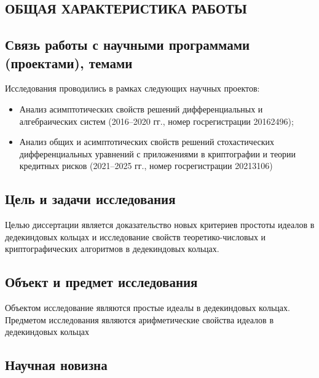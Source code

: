 \documentclass[_00_dissertation.tex]{subfiles}
\begin{document}
\onlyinsubfile{
    \renewcommand{\contentsname}{ОГЛАВЛЕНИЕ}
    \setcounter{tocdepth}{3}
    \tableofcontents
}

\begin{center}
    \chapter*{ОБЩАЯ ХАРАКТЕРИСТИКА РАБОТЫ}
\end{center}

\section*{Связь работы с научными программами (проектами), темами}

Исследования проводились в рамках следующих научных проектов:
\begin{itemize}
    \item Анализ асимптотических свойств решений дифференциальных и алгебраических систем (2016--2020 гг., номер госрегистрации 20162496);

    \item Анализ общих и асимптотических свойств решений стохастических дифференциальных уравнений с приложениями в криптографии и теории кредитных рисков (2021--2025 гг., номер госрегистрации 20213106)
\end{itemize}

\section*{Цель и задачи исследования}

Целью диссертации является доказательство новых критериев простоты идеалов в дедекиндовых кольцах и исследование свойств теоретико-числовых и криптографических алгоритмов в дедекиндовых кольцах.

\section*{Объект и предмет исследования}

Объектом исследование являются простые идеалы в дедекиндовых кольцах.
Предметом исследования являются арифметические свойства идеалов в дедекиндовых кольцах

\section*{Научная новизна}
\end{document}
